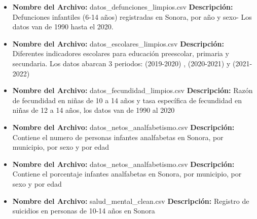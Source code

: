 \documentclass{article}
\begin{document}
\begin{itemize}
	\item \textbf{Nombre del Archivo:}
	datos\_defunciones\_limpios.csv
	\newline
		  \textbf{Descripción:} Defunciones infantiles (6-14 años) registradas en Sonora, por año y sexo- Los datos van de 1990 hasta el 2020.
	\item \textbf{Nombre del Archivo:} datos\_escolares\_limpios.csv
	\newline
		  \textbf{Descripción:} Diferentes indicadores escolares para educación preescolar, primaria y secundaria. Los datos abarcan 3 periodos: (2019-2020) , (2020-2021) y (2021-2022)
	\item \textbf{Nombre del Archivo:} datos\_fecundidad\_limpios.csv
	\newline
		  \textbf{Descripción:} Razón de fecundidad en niñas de 10 a 14 años y tasa específica de fecundidad en niñas de 12 a 14 años, los datos van de 1990 al 2020

	\item \textbf{Nombre del Archivo:} datos\_netos\_analfabetismo.csv
	\newline
		  \textbf{Descripción:} Contiene el numero de personas infantes analfabetas en Sonora, por municipio, por sexo y por edad


	\item \textbf{Nombre del Archivo:} datos\_netos\_analfabetismo.csv
	\newline
		  \textbf{Descripción:} Contiene el porcentaje infantes analfabetas en Sonora, por municipio, por sexo y por edad
		  
	\item \textbf{Nombre del Archivo:} salud\_mental\_clean.csv
	\newline
		  \textbf{Descripción:} Registro de suicidios en personas de 10-14 años en Sonora
\end{itemize}
\end{document}
